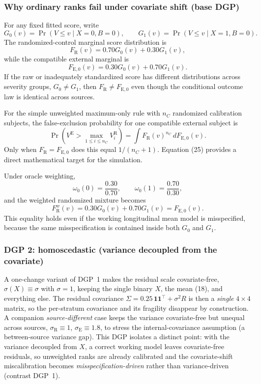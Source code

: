 \documentclass[11pt]{article}
\newcommand{\R}{\mathrm{R}}
\newcommand{\E}{\mathrm{E}}
\begin{document}
\subsubsection{Why ordinary ranks fail under covariate shift (base DGP)}

For any fixed fitted score, write
\[
G_0(v)=\Pr(V\le v\mid X=0,B=0),
\qquad
G_1(v)=\Pr(V\le v\mid X=1,B=0).
\]
The randomized-control marginal score distribution is
\[
F_{\R}(v)=0.70G_0(v)+0.30G_1(v),
\tag{23}
\]
while the compatible external marginal is
\[
F_{\E,0}(v)=0.30G_0(v)+0.70G_1(v).
\tag{24}
\]
If the raw or inadequately standardized score has different distributions across severity groups, $G_0\neq G_1$, then $F_{\R}\neq F_{\E,0}$ even though the conditional outcome law is identical across sources.

For the simple unweighted maximum-only rule with $n_C$ randomized calibration subjects, the false-exclusion probability for one compatible external subject is
\[
\Pr\left(V^{\E}>\max_{1\le i\le n_C}V_i^{\R}\right)
=
\int F_{\R}(v)^{n_C}\,dF_{\E,0}(v).
\tag{25}
\]
Only when $F_{\R}=F_{\E,0}$ does this equal $1/(n_C+1)$. Equation (25) provides a direct mathematical target for the simulation.

Under oracle weighting,
\[
\omega_0(0)=\frac{0.30}{0.70},
\qquad
\omega_0(1)=\frac{0.70}{0.30},
\tag{26}
\]
and the weighted randomized mixture becomes
\[
F_{\R}^{w}(v)
=0.30G_0(v)+0.70G_1(v)
=F_{\E,0}(v).
\tag{27}
\]
This equality holds even if the working longitudinal mean model is misspecified, because the same misspecification is contained inside both $G_0$ and $G_1$.

\subsubsection{DGP 2: homoscedastic (variance decoupled from the covariate)}

A one-change variant of DGP~1 makes the residual scale covariate-free, $\sigma(X){\equiv}\sigma$ with $\sigma{=}1$, keeping the single binary $X$, the mean (18), and everything else. The residual covariance $\Sigma=0.25\,\bm 1\bm 1^{\top}+\sigma^2 R$ is then a \emph{single} $4\times4$ matrix, so the per-stratum covariance and its fragility disappear by construction. A companion \emph{source-different} case keeps the variance covariate-free but unequal across sources, $\sigma_{\R}{\equiv}1$, $\sigma_{\E}{\equiv}1.8$, to stress the internal-covariance assumption (a between-source variance gap). This DGP isolates a distinct point: with the variance decoupled from $X$, a correct working model leaves covariate-free residuals, so unweighted ranks are already calibrated and the covariate-shift miscalibration becomes \emph{misspecification-driven} rather than variance-driven (contrast DGP~1).
\end{document}
